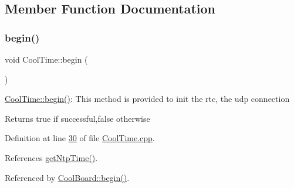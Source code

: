 \subsection{Member Function Documentation}
\mbox{\label{class_cool_time_ab1976cf718b950bc31e003c3323b8adb}} 
\subsubsection{\texorpdfstring{begin()}{begin()}}
{\footnotesize\ttfamily void Cool\+Time\+::begin (\begin{DoxyParamCaption}{ }\end{DoxyParamCaption})}

\hyperlink{class_cool_time_ab1976cf718b950bc31e003c3323b8adb}{Cool\+Time\+::begin()}\+: This method is provided to init the rtc, the udp connection

\begin{DoxyReturn}{Returns}
true if successful,false otherwise 
\end{DoxyReturn}


Definition at line \hyperlink{_cool_time_8cpp_source_l00030}{30} of file \hyperlink{_cool_time_8cpp_source}{Cool\+Time.\+cpp}.



References \hyperlink{_cool_time_8cpp_source_l00161}{get\+Ntp\+Time()}.



Referenced by \hyperlink{_cool_board_8cpp_source_l00021}{Cool\+Board\+::begin()}.


